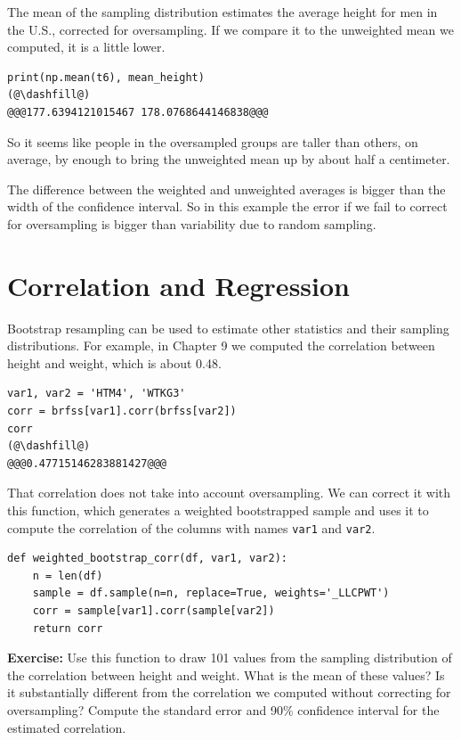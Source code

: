 The mean of the sampling distribution estimates the average height for
men in the U.S., corrected for oversampling. If we compare it to the
unweighted mean we computed, it is a little lower.

\begin{lstlisting}[]
print(np.mean(t6), mean_height)
(@\dashfill@)
@@@177.6394121015467 178.0768644146838@@@
\end{lstlisting}

So it seems like people in the oversampled groups are taller than
others, on average, by enough to bring the unweighted mean up by about
half a centimeter.

The difference between the weighted and unweighted averages is bigger
than the width of the confidence interval. So in this example the error
if we fail to correct for oversampling is bigger than variability due to
random sampling.

\hypertarget{correlation-and-regression}{%
\section{Correlation and Regression}\label{correlation-and-regression}}

Bootstrap resampling can be used to estimate other statistics and their
sampling distributions. For example, in Chapter 9 we computed the
correlation between height and weight, which is about 0.48.

\begin{lstlisting}[]
var1, var2 = 'HTM4', 'WTKG3'
corr = brfss[var1].corr(brfss[var2])
corr
(@\dashfill@)
@@@0.47715146283881427@@@
\end{lstlisting}

That correlation does not take into account oversampling. We can correct
it with this function, which generates a weighted bootstrapped sample
and uses it to compute the correlation of the columns with names
\passthrough{\lstinline!var1!} and \passthrough{\lstinline!var2!}.

\begin{lstlisting}[]
def weighted_bootstrap_corr(df, var1, var2):
    n = len(df)
    sample = df.sample(n=n, replace=True, weights='_LLCPWT')
    corr = sample[var1].corr(sample[var2])
    return corr
\end{lstlisting}

\textbf{Exercise:} Use this function to draw 101 values from the
sampling distribution of the correlation between height and weight. What
is the mean of these values? Is it substantially different from the
correlation we computed without correcting for oversampling? Compute the
standard error and 90\% confidence interval for the estimated
correlation.

